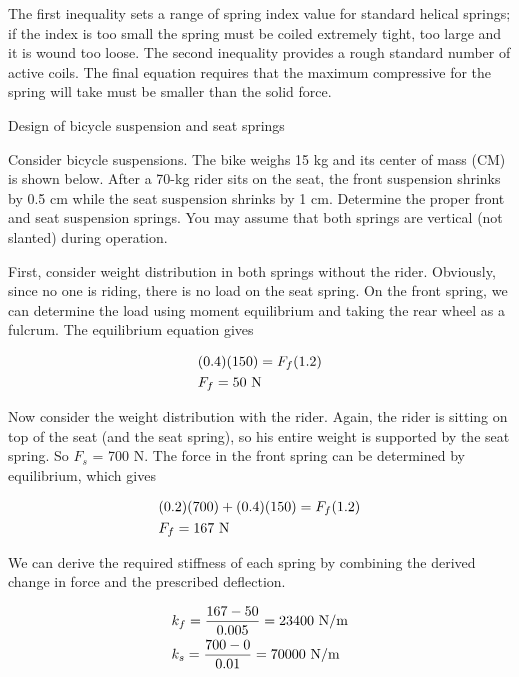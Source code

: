 \documentclass[a4paper,openany,nobib]{tufte-book}
\begin{document}
{{The first inequality sets a range of spring index value for standard
helical springs; if the index is too small the spring must be coiled
extremely tight, too large and it is wound too loose. The second
inequality provides a rough standard number of active coils. The final
equation requires that the maximum compressive for the spring will take
must be smaller than the solid force.

Design of bicycle suspension and seat springs

Consider bicycle suspensions. The bike weighs 15 kg and its center of
mass (CM) is shown below. After a 70-kg rider sits on the seat, the
front suspension shrinks by 0.5 cm while the seat suspension shrinks by
1 cm. Determine the proper front and seat suspension springs. You may
assume that both springs are vertical (not slanted) during operation.

First, consider weight distribution in both springs without the rider.
Obviously, since no one is riding, there is no load on the seat spring.
On the front spring, we can determine the load using moment equilibrium
and taking the rear wheel as a fulcrum. The equilibrium equation gives

$$\begin{gathered}
      (0.4)(150) = F_f(1.2) \hfill \\
      F_f = 50 \text{ N} \hfill \\ 
    \end{gathered}$$

Now consider the weight distribution with the rider. Again, the rider is
sitting on top of the seat (and the seat spring), so his entire weight
is supported by the seat spring. So \(F_s\) = 700 N. The force in the
front spring can be determined by equilibrium, which gives

$$\begin{gathered}
      (0.2)(700) + (0.4)(150) = F_f(1.2) \hfill \\
      F_f = 167 \text{ N} \hfill \\ 
    \end{gathered}$$

We can derive the required stiffness of each spring by combining the
derived change in force and the prescribed deflection.

$$\begin{gathered}
      k_f = \frac{167 - 50}{0.005} = 23400 \text{ N/m} \hfill \\
      k_s = \frac{700 - 0}{0.01} = 70000 \text{ N/m} \hfill \\ 
    \end{gathered}$$

}}
\end{document}
